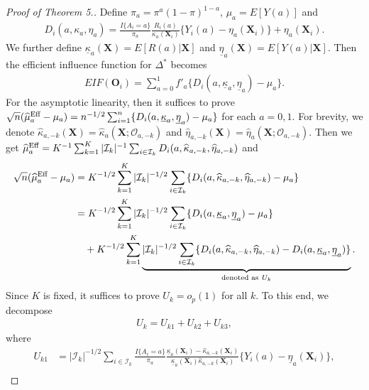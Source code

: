 \documentclass[12pt]{article}
\newcommand{\bX}{\boldsymbol{X}}
\newcommand{\bO}{\boldsymbol{O}}
\begin{document}
\begin{proof}[Proof of Theorem 5.]
   Define $\pi_a = \pi^a(1-\pi)^{1-a}$, $\mu_a = E[Y(a)]$ and
    \begin{align*}
        D_i(a,\kappa_a,\eta_a) = \frac{I\{A_i=a\}}{\pi_a}\frac{R_i(a)}{\kappa_a(\bX_i)}\{Y_i(a)  - \eta_a(\bX_i)\} + \eta_a(\bX_i).
    \end{align*}
    We further define $\underline{\kappa}_a(\bX) = E[R(a)|\bX]$ and $\underline{\eta}_a(\bX) = E[Y(a)|\bX]$. Then the efficient influence function for $\Delta^*$ becomes
    \begin{align*}
      EIF(\bO_i) =  \sum_{a=0}^1 f'_a \{D_i(a,\underline{\kappa}_a,\underline{\eta}_a)-\mu_a\}.
    \end{align*}
    For the asymptotic linearity, then it suffices to prove $\sqrt{n}(\widehat{\mu}_a^{\textup{Eff}}-\mu_a) = n^{-1/2} \sum_{i=1}^n \{D_i(a, \underline{\kappa}_a,\underline{\eta}_a)-\mu_a\}$  for each $a = 0,1$. 
    For brevity, we denote $\widehat{\kappa}_{a,-k}(\bX) = \widehat{\kappa}_{a}(\bX;\mathcal{O}_{a,-k})$ and $\widehat{\eta}_{a,-k}(\bX) = \widehat{\eta}_{a}(\bX;\mathcal{O}_{a, -k})$. Then we get $\widehat{\mu}_a^{\textup{Eff}} = K^{-1} \sum_{k=1}^K |\mathcal{I}_k|^{-1} \sum_{i \in \mathcal{I}_k} D_i(a, \widehat{\kappa}_{a,-k}, \widehat{\eta}_{a,-k})$ and
    \begin{align*}
        \sqrt{n}(\widehat{\mu}_a^{\textup{Eff}}-\mu_a) &= K^{-1/2} \sum_{k=1}^K |\mathcal{I}_k|^{-1/2} \sum_{i \in \mathcal{I}_k} \{D_i(a, \widehat{\kappa}_{a, -k}, \widehat{\eta}_{a, -k}) - \mu_a \} \\
        &= K^{-1/2} \sum_{k=1}^K |\mathcal{I}_k|^{-1/2} \sum_{i \in \mathcal{I}_k} \{D_i(a, \underline{\kappa}_{a}, \underline{\eta}_{a}) - \mu_a \} \\
        &\quad +  K^{-1/2} \sum_{k=1}^K  \underbrace{|\mathcal{I}_k|^{-1/2}\sum_{i \in \mathcal{I}_k} \{D_i(a, \widehat{\kappa}_{a, -k}, \widehat{\eta}_{a, -k}) - D_i(a, \underline{\kappa}_{a}, \underline{\eta}_{a})\}}_{{\textup{denoted as}\ U_k}}.
    \end{align*}
Since $K$ is fixed, it suffices to prove $U_k = o_p(1)$ for all $k$. To this end, we decompose
\begin{align*}
    U_k = U_{k1} + U_{k2} + U_{k3},
\end{align*}
where
\begin{align*}
    U_{k1} &= |\mathcal{I}_k|^{-1/2} \sum_{i \in \mathcal{I}_k} \frac{I\{A_i=a\}}{\pi_a} \frac{\underline{\kappa}_a(\bX_i) - \widehat{\kappa}_{a,-k}(\bX_i)}{\underline{\kappa}_a(\bX_i)\widehat{\kappa}_{a,-k}(\bX_i)}\{Y_i(a) - \underline{\eta}_a(\bX_i)\},\\

\end{align*}
\end{proof}
\end{document}
